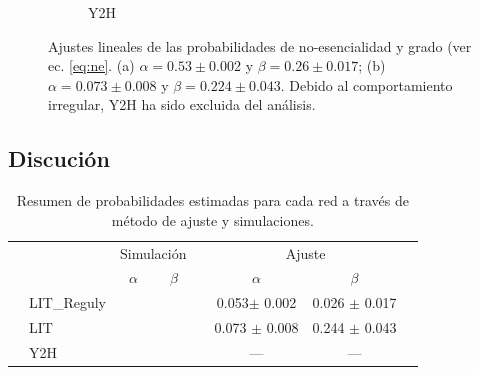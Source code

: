 \begin{figure}[!ht]
\begin{subfigure}[b]{0.4\columnwidth}
        \caption{\label{fig:y2h} Y2H}
    \end{subfigure}
    \caption{\label{fig:fit} Ajustes lineales de las probabilidades de no-esencialidad y grado (ver ec. \ref{eq:ne}. 
    (a) $\alpha = 0.53 \pm 0.002 $ y $\beta = 0.26 \pm 0.017$; (b) $\alpha = 0.073 \pm 0.008$ y $\beta = 0.224 \pm 0.043$. 
    Debido al comportamiento irregular, Y2H ha sido excluida del an\'alisis.}
\end{figure}





\subsection{Discuci\'on}
\begin{table}[!ht]
    \centering
    \caption{\label{tab:probas} Resumen de probabilidades estimadas para cada red a trav\'es de m\'etodo de ajuste
y simulaciones.}
    {\scriptsize
    \begin{tabularx}{.9\columnwidth}{XlccXccX}
        \hline\hline
        &               &  \multicolumn{2}{c}{Simulaci\'on}  &&  \multicolumn{2}{c}{Ajuste}          &      \\
        \cline{3-4} \cline{6-7}
        &               &   $\alpha$    & $\beta$            &&   $\alpha$       &       $\beta$     & \\
        \hline
        & LIT\_Reguly   &    &         && 0.053$ \pm$ 0.002  & 0.026 $\pm$ 0.017       &               \\
        & LIT           &    &         && 0.073 $\pm$ 0.008  & 0.244 $\pm$ 0.043       &               \\
        & Y2H           &    &         &&    ---             &   ---              &               \\
        \hline\hline
    \end{tabularx}
    }
\end{table}


